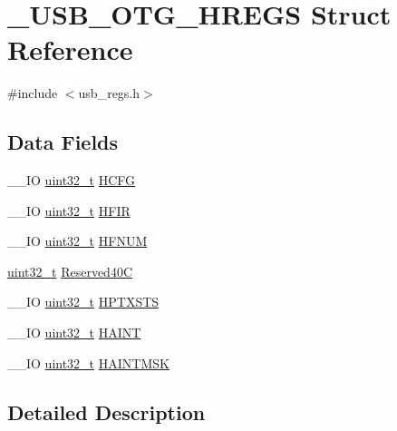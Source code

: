 \hypertarget{struct___u_s_b___o_t_g___h_r_e_g_s}{\section{\-\_\-\-U\-S\-B\-\_\-\-O\-T\-G\-\_\-\-H\-R\-E\-G\-S Struct Reference}
\label{struct___u_s_b___o_t_g___h_r_e_g_s}
}


{\ttfamily \#include $<$usb\-\_\-regs.\-h$>$}

\subsection*{Data Fields}
\begin{DoxyCompactItemize}
\item 
\-\_\-\-\_\-\-I\-O \hyperlink{stdint_8h_a435d1572bf3f880d55459d9805097f62}{uint32\-\_\-t} \hyperlink{group___u_s_b___o_t_g___d_r_i_v_e_r_gac1e2d946a7649660bdb5b24442411b9a}{H\-C\-F\-G}
\item 
\-\_\-\-\_\-\-I\-O \hyperlink{stdint_8h_a435d1572bf3f880d55459d9805097f62}{uint32\-\_\-t} \hyperlink{group___u_s_b___o_t_g___d_r_i_v_e_r_gae044265829e203cac4abdfc133eb8467}{H\-F\-I\-R}
\item 
\-\_\-\-\_\-\-I\-O \hyperlink{stdint_8h_a435d1572bf3f880d55459d9805097f62}{uint32\-\_\-t} \hyperlink{group___u_s_b___o_t_g___d_r_i_v_e_r_gae4ad9b94bbef9b3687675e5b97ed31d7}{H\-F\-N\-U\-M}
\item 
\hyperlink{stdint_8h_a435d1572bf3f880d55459d9805097f62}{uint32\-\_\-t} \hyperlink{group___u_s_b___o_t_g___d_r_i_v_e_r_ga4ee95a63cf99de5521e87851064bbe02}{Reserved40\-C}
\item 
\-\_\-\-\_\-\-I\-O \hyperlink{stdint_8h_a435d1572bf3f880d55459d9805097f62}{uint32\-\_\-t} \hyperlink{group___u_s_b___o_t_g___d_r_i_v_e_r_ga652cf8d8c6553dc44901bdffa7d6c090}{H\-P\-T\-X\-S\-T\-S}
\item 
\-\_\-\-\_\-\-I\-O \hyperlink{stdint_8h_a435d1572bf3f880d55459d9805097f62}{uint32\-\_\-t} \hyperlink{group___u_s_b___o_t_g___d_r_i_v_e_r_gad9a8188233e5828e6e4f834ced7a0d1e}{H\-A\-I\-N\-T}
\item 
\-\_\-\-\_\-\-I\-O \hyperlink{stdint_8h_a435d1572bf3f880d55459d9805097f62}{uint32\-\_\-t} \hyperlink{group___u_s_b___o_t_g___d_r_i_v_e_r_gafa6f6d9cc7d7eec8c6ce03f807d0f89a}{H\-A\-I\-N\-T\-M\-S\-K}
\end{DoxyCompactItemize}


\subsection{Detailed Description}


